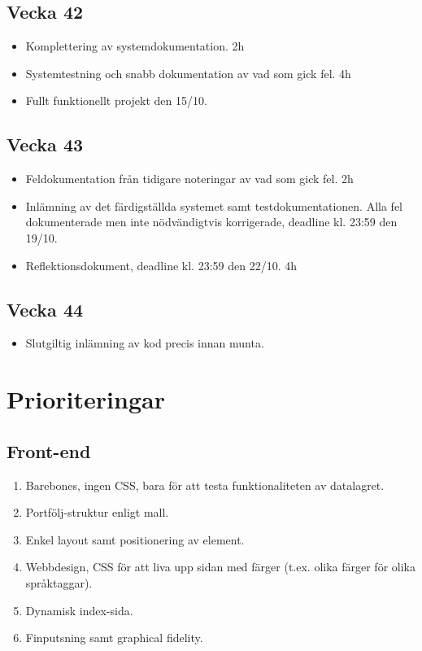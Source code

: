 \documentclass{TDP003mall}
\begin{document}
\subsection{Vecka 42}
\begin{itemize}
\item Komplettering av systemdokumentation. 2h
\item Systemtestning och snabb dokumentation av vad som gick fel. 4h
\item Fullt funktionellt projekt den 15/10.
\end{itemize}

\subsection{Vecka 43}
\begin{itemize}
\item Feldokumentation från tidigare noteringar av vad som gick fel. 2h
\item Inlämning av det färdigställda systemet samt testdokumentationen. Alla fel dokumenterade men inte nödvändigtvis korrigerade, deadline kl. 23:59 den 19/10.
\item Reflektionsdokument, deadline kl. 23:59 den 22/10. 4h
\end{itemize}

\subsection{Vecka 44}
\begin{itemize}
\item Slutgiltig inlämning av kod precis innan munta.
\end{itemize}

\section{Prioriteringar}

\subsection{Front-end}
\begin{enumerate}
\item Barebones, ingen CSS, bara för att testa funktionaliteten av datalagret.
\item Portfölj-struktur enligt mall.
\item Enkel layout samt positionering av element.
\item Webbdesign, CSS för att liva upp sidan med färger (t.ex. olika färger för olika språktaggar).
\item Dynamisk index-sida.
\item Finputsning samt graphical fidelity.
\end{enumerate}
\end{document}
